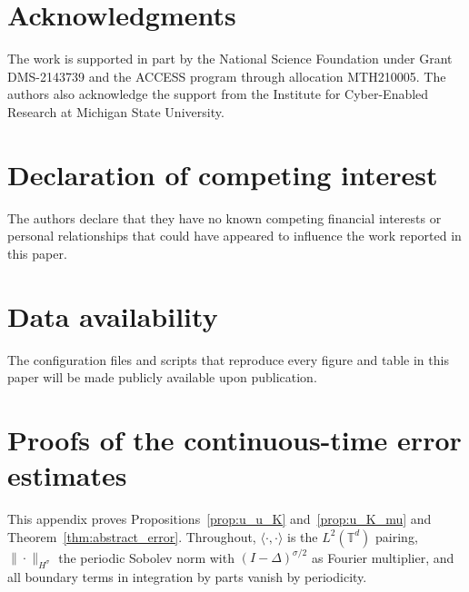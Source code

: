 \documentclass[a4paper,fleqn]{cas-sc}
\theoremstyle{definition}
\theoremstyle{remark}
\begin{document}
\section*{Acknowledgments}
The work is supported in part by the National Science Foundation under Grant DMS-2143739 and the ACCESS program through allocation MTH210005.
The authors also acknowledge the support from the Institute for Cyber-Enabled Research at Michigan State University.

\section*{Declaration of competing interest}
The authors declare that they have no known competing financial interests or personal relationships that could
have appeared to influence the work reported in this paper.

\section*{Data availability}
The configuration files and scripts that reproduce every figure and table in this paper will be made publicly
available upon publication.

\appendix

\section{Proofs of the continuous-time error estimates}
\label{app:convergence}
This appendix proves Propositions~\ref{prop:u_u_K} and~\ref{prop:u_K_mu} and
Theorem~\ref{thm:abstract_error}. Throughout, $\langle\cdot,\cdot\rangle$ is the
$L^2(\mathbb T^d)$ pairing, $\|\cdot\|_{H^\sigma}$ the periodic Sobolev norm with
$(I-\Delta)^{\sigma/2}$ as Fourier multiplier, and all boundary terms in
integration by parts vanish by periodicity.
\end{document}
